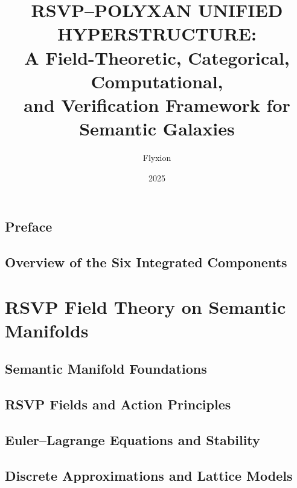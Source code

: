 \documentclass[11pt,oneside]{book}
\title{\Huge\bfseries
RSVP--POLYXAN UNIFIED HYPERSTRUCTURE:\\[0.5em]
\Large A Field-Theoretic, Categorical, Computational,\\
and Verification Framework for Semantic Galaxies
}
\author{Flyxion}
\date{2025}
\begin{document}
\frontmatter
\maketitle
\tableofcontents


\chapter*{Preface}


\chapter*{Overview of the Six Integrated Components}


\mainmatter


\part{RSVP Field Theory on Semantic Manifolds}

\chapter{Semantic Manifold Foundations}


\chapter{RSVP Fields and Action Principles}


\chapter{Euler--Lagrange Equations and Stability}


\chapter{Discrete Approximations and Lattice Models}

\end{document}
